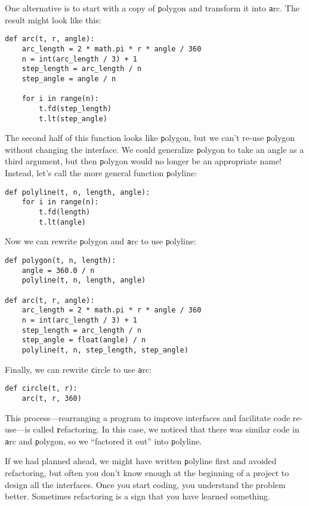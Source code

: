 \documentclass[
DIV=11,
fontsize=12,
twoside,
headinclude=false,
titlepage=firstiscover,
abstract=true,
headsepline=true,
footsepline=true,
chapterprefix=true, %
headings=big,
bibliography=totoc,%
captions=tableheading
]{scrbook}
\theoremstyle{definition}
\begin{document}
One alternative is to start with a copy
of {\texttt polygon} and transform it into {\texttt arc}.  The result
might look like this:

\begin{lstlisting}
def arc(t, r, angle):
    arc_length = 2 * math.pi * r * angle / 360
    n = int(arc_length / 3) + 1
    step_length = arc_length / n
    step_angle = angle / n
    
    for i in range(n):
        t.fd(step_length)
        t.lt(step_angle)
\end{lstlisting}
%
The second half of this function looks like {\texttt polygon}, but we
can't re-use {\texttt polygon} without changing the interface.  We could
generalize {\texttt polygon} to take an angle as a third argument,
but then {\texttt polygon} would no longer be an appropriate name!
Instead, let's call the more general function {\texttt polyline}:

\begin{lstlisting}
def polyline(t, n, length, angle):
    for i in range(n):
        t.fd(length)
        t.lt(angle)
\end{lstlisting}
%
Now we can rewrite {\texttt polygon} and {\texttt arc} to use {\texttt polyline}:

\begin{lstlisting}
def polygon(t, n, length):
    angle = 360.0 / n
    polyline(t, n, length, angle)

def arc(t, r, angle):
    arc_length = 2 * math.pi * r * angle / 360
    n = int(arc_length / 3) + 1
    step_length = arc_length / n
    step_angle = float(angle) / n
    polyline(t, n, step_length, step_angle)
\end{lstlisting}
%
Finally, we can rewrite {\texttt circle} to use {\texttt arc}:

\begin{lstlisting}
def circle(t, r):
    arc(t, r, 360)
\end{lstlisting}
%
This process---rearranging a program to improve
interfaces and facilitate code re-use---is called {\textbf refactoring}.
In this case, we noticed that there was similar code in {\texttt arc} and
{\texttt polygon}, so we ``factored it out'' into {\texttt polyline}.

If we had planned ahead, we might have written {\texttt polyline} first
and avoided refactoring, but often you don't know enough at the
beginning of a project to design all the interfaces.  Once you start
coding, you understand the problem better.  Sometimes refactoring is a
sign that you have learned something.
\end{document}
